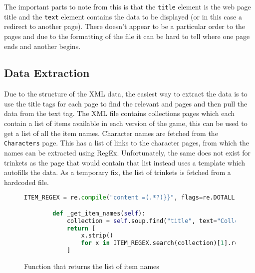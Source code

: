 The important parts to note from this is that the \verb|title| element is the web page title and the \verb|text| element contains the data to be displayed (or in this case a redirect to another page).
There doesn't appear to be a particular order to the pages and due to the formatting of the file it can be hard to tell where one page ends and another begins.
\subsection{Data Extraction}
Due to the structure of the XML data, the easiest way to extract the data is to use the title tags for each page to find the relevant and pages 
and then pull the data from the text tag. The XML file contains collections pages which each contain a list of items available in each version of the game, this can be 
used to get a list of all the item names. Character names are fetched from the \verb|Characters| page. This has a list of links to the character pages, from which the names can be extracted using RegEx. 
Unfortunately, the same does not exist for trinkets as the page that would contain that list instead uses a template which autofills the data. 
As a temporary fix, the list of trinkets is fetched from a hardcoded file.
\begin{figure}[!htbp]
    \begin{lstlisting}[language=Python]
        ITEM_REGEX = re.compile("content =(.*?)}}", flags=re.DOTALL)

        def _get_item_names(self):
            collection = self.soup.find("title", text="Collection Page (Repentance)").find_parent("page").find("text").text
            return [
                x.strip()
                for x in ITEM_REGEX.search(collection)[1].replace("\n", "").replace("Number Two", "No. 2").split(",")
            ]
    \end{lstlisting}
    \caption{Function that returns the list of item names}
\end{figure}

